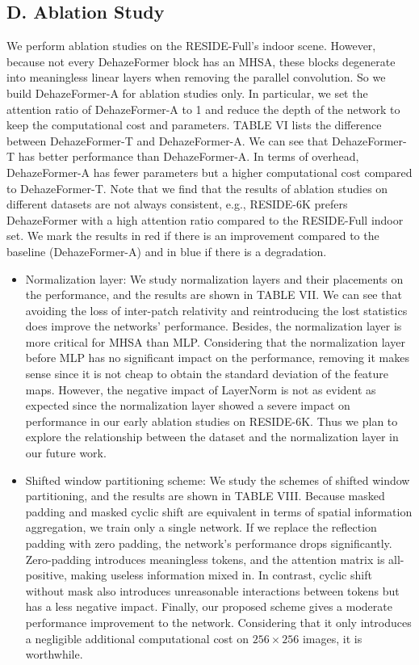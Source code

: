 \documentclass{article}
\begin{document}
\subsection{D. Ablation Study}


We perform ablation studies on the RESIDE-Full’s indoor scene. However, because not every DehazeFormer block has an MHSA, these blocks degenerate into meaningless linear layers when removing the parallel convolution. So we build DehazeFormer-A for ablation studies only. In particular, we set the attention ratio of DehazeFormer-A to 1 and reduce the depth of the network to keep the computational cost and parameters. TABLE VI lists the difference between DehazeFormer-T and DehazeFormer-A. We can see that DehazeFormer-T has better performance than DehazeFormer-A. In terms of overhead, DehazeFormer-A has fewer parameters but a higher computational cost compared to DehazeFormer-T. Note that we find that the results of ablation studies on different datasets are not always consistent, e.g., RESIDE-6K prefers DehazeFormer with a high attention ratio compared to the RESIDE-Full indoor set. We mark the results in red if there is an improvement compared to the baseline (DehazeFormer-A) and in blue if there is a degradation.


\begin{itemize}
\item Normalization layer: We study normalization layers and their placements on the performance, and the results are shown in TABLE VII. We can see that avoiding the loss of inter-patch relativity and reintroducing the lost statistics does improve the networks’ performance. Besides, the normalization layer is more critical for MHSA than MLP. Considering that the normalization layer before MLP has no significant impact on the performance, removing it makes sense since it is not cheap to obtain the standard deviation of the feature maps. However, the negative impact of LayerNorm is not as evident as expected since the normalization layer showed a severe impact on performance in our early ablation studies on RESIDE-6K. Thus we plan to explore the relationship between the dataset and the normalization layer in our future work.


\item Shifted window partitioning scheme: We study the schemes of shifted window partitioning, and the results are shown in TABLE VIII. Because masked padding and masked cyclic shift are equivalent in terms of spatial information aggregation, we train only a single network. If we replace the reflection padding with zero padding, the network’s performance drops significantly. Zero-padding introduces meaningless tokens, and the attention matrix is all-positive, making useless information mixed in. In contrast, cyclic shift without mask also introduces unreasonable interactions between tokens but has a less negative impact. Finally, our proposed scheme gives a moderate performance improvement to the network. Considering that it only introduces a negligible additional computational cost on $256\times256$ images, it is worthwhile.


\end{itemize}
\end{document}
